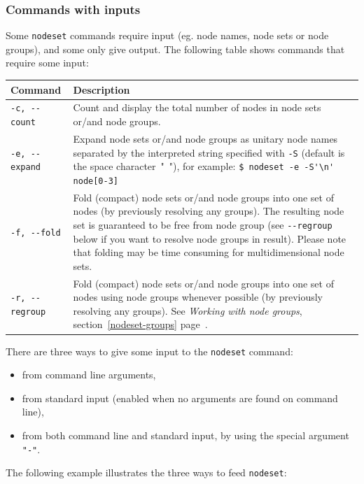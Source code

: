 \documentclass[english,a4paper]{csuserguide}
\newcommand{\nodeset}{\texttt{nodeset}\xspace}
\begin{document}
\subsubsection{Commands with inputs}

Some  \nodeset commands require input (eg. node names, node sets or node groups), and some only give output. The following table shows commands that require some input:

\begin{center}
\label{nodeset-cmds}
\begin{tabular}{|p{3.2cm}|p{13.2cm}|} 
\hline 
\textbf{Command} & \textbf{Description} \\
\hline
\verb+-c, --count+& Count and display the total number of nodes in node sets or/and node groups.\\
\hline
\verb+-e, --expand+ & Expand node sets or/and node groups as unitary node names separated by the interpreted string specified with \verb+-S+ (default is the space character\mbox{ " "}), for example:
\lstinline+$ nodeset -e -S'\n' node[0-3]+\\
\hline
\verb+-f, --fold+ & Fold (compact) node sets or/and node groups into one set of nodes (by previously resolving any groups). The resulting node set is guaranteed to be free from node group (see \verb+--regroup+ below if you want to resolve node groups in result). Please note that folding may be time consuming for multidimensional node sets.\\
\hline
\verb+-r, --regroup+ & Fold (compact) node sets or/and node groups into one set of nodes using node groups whenever possible (by previously resolving any groups). See \textit{Working with node groups}, section~\ref{nodeset-groups} page~\pageref{nodeset-groups}.\\
\hline
\end{tabular}
\end{center}


There are three ways to give some input to the \nodeset command:
\begin{itemize}
\item{from command line arguments,}
\item{from standard input (enabled when no arguments are found on command line),}
\item{from both command line and standard input, by using the special argument \verb+"-"+.}
\end{itemize}

The following example illustrates the three ways to feed \nodeset:
\bigskip
\end{document}
